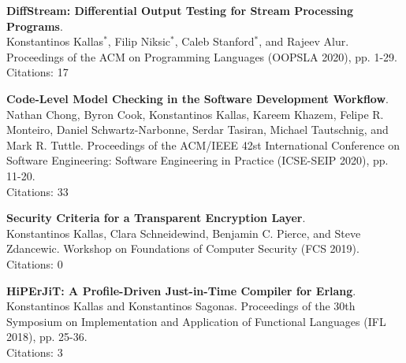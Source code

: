 \begin{minipage}{\textwidth}
\textbf{DiffStream: Differential Output Testing for Stream Processing Programs}. \\
Konstantinos Kallas$^*$, Filip Niksic$^*$, Caleb Stanford$^*$, and Rajeev Alur.
Proceedings of the ACM on Programming Languages (OOPSLA 2020), pp. 1-29. \\
Citations: 17
\end{minipage}

\begin{minipage}{\textwidth}
\textbf{Code-Level Model Checking in the Software Development Workflow}. \\
Nathan Chong, Byron Cook, Konstantinos Kallas, Kareem Khazem, Felipe R. Monteiro, Daniel Schwartz-Narbonne, Serdar Tasiran, Michael Tautschnig, and Mark R. Tuttle.
Proceedings of the ACM/IEEE 42st International Conference on Software Engineering: Software Engineering in Practice (ICSE-SEIP 2020), pp. 11-20. \\
Citations: 33
\end{minipage}

\begin{minipage}{\textwidth}
\textbf{Security Criteria for a Transparent Encryption Layer}. \\
Konstantinos Kallas, Clara Schneidewind, Benjamin C. Pierce, and Steve Zdancewic.
Workshop on Foundations of Computer Security (FCS 2019). \\
Citations: 0
\end{minipage}

\begin{minipage}{\textwidth}
\textbf{HiPErJiT: A Profile-Driven Just-in-Time Compiler for Erlang}. \\
Konstantinos Kallas and Konstantinos Sagonas.
Proceedings of the 30th Symposium on Implementation and Application of Functional Languages (IFL 2018), pp. 25-36. \\
Citations: 3
\end{minipage}


